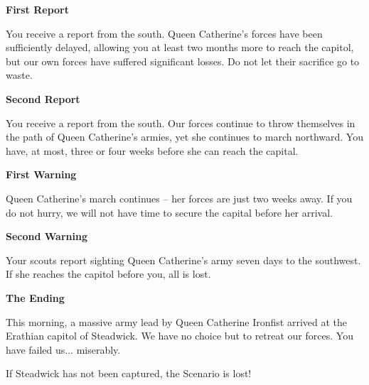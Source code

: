 \begin{multicols*}{2}
\textbf{First Report}

You receive a report from the south.
Queen Catherine's forces have been sufficiently delayed, allowing you at least two months more to reach the capitol, but our own forces have suffered significant losses.
Do not let their sacrifice go to waste.

\textbf{Second Report}

You receive a report from the south.
Our forces continue to throw themselves in the path of Queen Catherine's armies, yet she continues to march northward.
You have, at most, three or four weeks before she can reach the capital.

\textbf{First Warning}

Queen Catherine's march continues -- her forces are just two weeks away.
If you do not hurry, we will not have time to secure the capital before her arrival.

\textbf{Second Warning}

Your scouts report sighting Queen Catherine's army seven days to the southwest.
If she reaches the capitol before you, all is lost.

\textbf{The Ending}

This morning, a massive army lead by Queen Catherine Ironfist arrived at the Erathian capitol of Steadwick.
We have no choice but to retreat our forces.
You have failed us... miserably.

\textcolor{darkcandyapplered}{If Steadwick has not been captured, the Scenario is lost!}

\end{multicols*}

